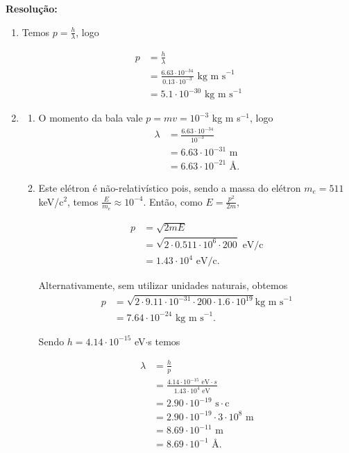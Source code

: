 \documentclass[a4paper, 12pt, notitlepage]{article}
\begin{document}
\begin{enumerate}
\begin{enumerate}
\end{enumerate}

\textbf{Resolução: }
\begin{enumerate}
  \item Temos $p = \frac{h}{\lambda}$, logo

  \begin{align*}
p &= \frac{h}{\lambda} \\
&= \frac{6.63 \cdot 10^{-34}}{0.13 \cdot 10^{-3}} \text{ kg m s}^{-1} \\
&= 5.1 \cdot 10^{-30}\text{ kg m s}^{-1}
  \end{align*}

  \item
  \begin{enumerate}
    \item O momento da bala vale $p = mv = 10^{-3}$ kg m s$^{-1}$, logo 
      \begin{align*}
\lambda &= \frac{6.63 \cdot 10^{-34}}{10^{-3}}\\
&= 6.63 \cdot 10^{-31} \text{ m} \\
&= 6.63 \cdot 10^{-21} \text{ \AA.}
      \end{align*}

  \item Este elétron é não-relativístico pois, sendo a massa do elétron $m_e = 511$ keV/c$^2$, temos $\frac{E}{m_e} \approx 10^{-4}$. Então, como $E = \frac{p^2}{2m}$, 

      \begin{align*}
p &= \sqrt{2mE}\\
&= \sqrt{2 \cdot 0.511 \cdot 10^{6} \cdot 200} \text{ eV/c}\\
&= 1.43 \cdot 10^4\text{ eV/c.}
      \end{align*}

      Alternativamente, sem utilizar unidades naturais, obtemos
      \begin{align*}
p &= \sqrt{2 \cdot 9.11 \cdot 10^{-31} \cdot 200 \cdot 1.6 \cdot 10^{19}} \text{kg m s}^{-1} \\
&= 7.64 \cdot 10^{-24} \text{ kg m s}^{-1}.
      \end{align*}

      Sendo $h = 4.14 \cdot 10^{-15}$ eV$\cdot$s temos

      \begin{align*}
\lambda &= \frac{h}{p} \\
&= \frac{4.14 \cdot 10^{-15}\text{ eV}\cdot{s}}{1.43 \cdot 10^4 \text{ eV}} \\
&= 2.90 \cdot 10^{-19} \text{ s}\cdot\text{c} \\
&= 2.90\cdot 10^{-19} \cdot 3 \cdot 10^8 \text{ m} \\
&= 8.69 \cdot 10^{-11} \text{ m}\\
&= 8.69 \cdot 10^{-1} \text{ \AA}.
      \end{align*}


\end{enumerate}
\end{enumerate}
\end{enumerate}
\end{document}
